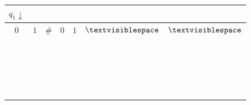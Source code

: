 \documentclass[12pt, oneside]{article}
\begin{document}
\begin{multicols}{2}
\begin{tabular}{|c|c|c|c|c|c|c|}
\hline
\multicolumn{1}{|c}{$q_1 \downarrow$} &  \multicolumn{6}{c|}{\phantom{A}}\\
\hline
$0$ & $1$  & $\#$  & $0$ & $1$ & $\textvisiblespace $& $\textvisiblespace $\\
\hline
  \multicolumn{7}{|c|}{\phantom{A}}\\
  \hline
  \phantom{AA} & \phantom{AA}& \phantom{AA}& \phantom{AA}& \phantom{AA}& \phantom{AA}& \phantom{AA} \\
  \hline
  \multicolumn{7}{|c|}{\phantom{A}}\\
  \hline
  \phantom{AA} & \phantom{AA}& \phantom{AA}& \phantom{AA}& \phantom{AA}& \phantom{AA}& \phantom{AA} \\
  \hline
  \multicolumn{7}{|c|}{\phantom{A}}\\
  \hline
  \phantom{AA} & \phantom{AA}& \phantom{AA}& \phantom{AA}& \phantom{AA}& \phantom{AA}& \phantom{AA} \\
  \hline
  \multicolumn{7}{|c|}{\phantom{A}}\\
  \hline
  \phantom{AA} & \phantom{AA}& \phantom{AA}& \phantom{AA}& \phantom{AA}& \phantom{AA}& \phantom{AA} \\
  \hline
  \multicolumn{7}{|c|}{\phantom{A}}\\
  \hline
  \phantom{AA} & \phantom{AA}& \phantom{AA}& \phantom{AA}& \phantom{AA}& \phantom{AA}& \phantom{AA} \\
  \hline
  \multicolumn{7}{|c|}{\phantom{A}}\\
  \hline
  \phantom{AA} & \phantom{AA}& \phantom{AA}& \phantom{AA}& \phantom{AA}& \phantom{AA}& \phantom{AA} \\
  \hline
  \multicolumn{7}{|c|}{\phantom{A}}\\
  \hline
  \phantom{AA} & \phantom{AA}& \phantom{AA}& \phantom{AA}& \phantom{AA}& \phantom{AA}& \phantom{AA} \\
  \hline
  \multicolumn{7}{|c|}{\phantom{A}}\\
  \hline
  \phantom{AA} & \phantom{AA}& \phantom{AA}& \phantom{AA}& \phantom{AA}& \phantom{AA}& \phantom{AA} \\
  \hline
  \multicolumn{7}{|c|}{\phantom{A}}\\
  \hline
  \phantom{AA} & \phantom{AA}& \phantom{AA}& \phantom{AA}& \phantom{AA}& \phantom{AA}& \phantom{AA} \\
  \hline
  \multicolumn{7}{|c|}{\phantom{A}}\\
  \hline
  \phantom{AA} & \phantom{AA}& \phantom{AA}& \phantom{AA}& \phantom{AA}& \phantom{AA}& \phantom{AA} \\

\end{tabular}
\end{multicols}
\end{document}
